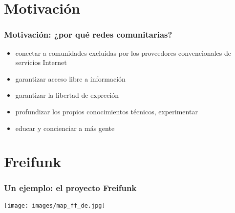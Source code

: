 \documentclass[12pt, xcolor=table]{beamer}
\begin{document}
\section{Motivación}
\begin{frame}
  \frametitle{Motivación: ¿por qué redes comunitarias?}
  \begin{itemize}
    \item conectar a comunidades excluidas por los proveedores convencionales de servicios Internet
    \item garantizar acceso libre a información
    \item garantizar la libertad de expreción
    \item profundizar los propios conocimientos técnicos, experimentar
    \item educar y concienciar a más gente
  \end{itemize}
\end{frame}

\begin{comment}
\section{La parte técnica}
\begin{frame}
  \frametitle{La parte técnica: ¿cómo funciona?}
    \begin{itemize}
      \item nodos de la red: routers
      \item software especial
      \item software libre desarollado por la comunidad (qué es software libre)
      \item una red mesh vs la topografía estandard (estrella)
      \item add picture of mesh network
      \item cada nodo está conocido dentro de la red
      \item cada nodo sabe como puede enviar datos hasta el nodo destinatario
    \end{itemize}
\end{frame}
\end{comment}

\section{Freifunk}
\begin{frame}
  \frametitle{Un ejemplo: el proyecto Freifunk}
  \vspace{50pt}
    \texttt{[image: images/map\_ff\_de.jpg]}
\end{frame}
\end{document}
